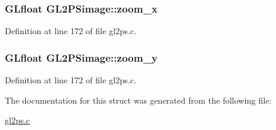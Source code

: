 \hypertarget{struct_g_l2_p_simage_abcbc582a823b354c09262fa5d858eba0}{}
\subsubsection[{zoom\+\_\+x}]{\setlength{\rightskip}{0pt plus 5cm}G\+Lfloat G\+L2\+P\+Simage\+::zoom\+\_\+x}\label{struct_g_l2_p_simage_abcbc582a823b354c09262fa5d858eba0}


Definition at line 172 of file gl2ps.\+c.

\hypertarget{struct_g_l2_p_simage_a14f4807f330990ab0c203fe08669d647}{}
\subsubsection[{zoom\+\_\+y}]{\setlength{\rightskip}{0pt plus 5cm}G\+Lfloat G\+L2\+P\+Simage\+::zoom\+\_\+y}\label{struct_g_l2_p_simage_a14f4807f330990ab0c203fe08669d647}


Definition at line 172 of file gl2ps.\+c.



The documentation for this struct was generated from the following file\+:\begin{DoxyCompactItemize}
\item 
\hyperlink{gl2ps_8c}{gl2ps.\+c}\end{DoxyCompactItemize}

